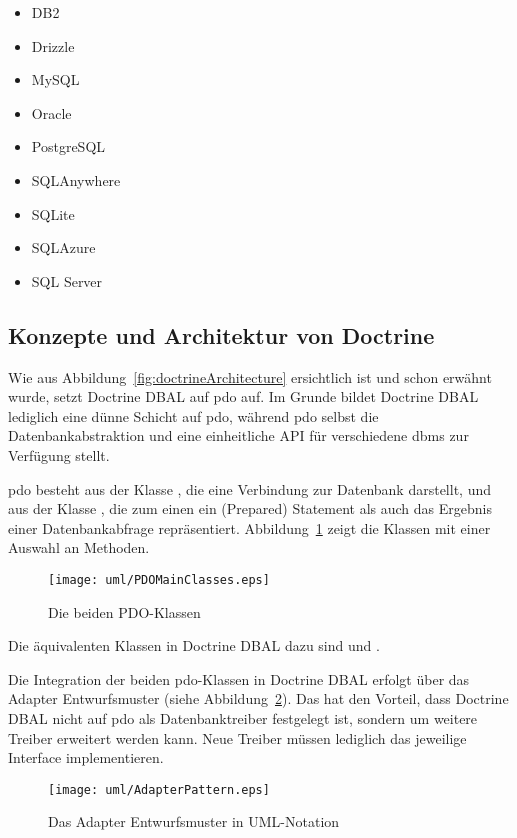 \begin{itemize}
		\item DB2
		\item Drizzle
		\item MySQL
		\item Oracle
		\item PostgreSQL
		\item SQLAnywhere
		\item SQLite
		\item SQLAzure
		\item SQL Server
\end{itemize}

\subsection{Konzepte und Architektur von Doctrine}
\label{basics:doctrine:subsec:conceptsAndArchitectureOfDoctrine}
Wie aus Abbildung~\ref{fig:doctrineArchitecture} ersichtlich ist und schon erwähnt wurde, setzt Doctrine DBAL auf \gls{pdo} auf. Im Grunde bildet Doctrine DBAL lediglich eine dünne Schicht auf \gls{pdo}, während \gls{pdo} selbst die Datenbankabstraktion und eine einheitliche API für verschiedene \gls{dbms} zur Verfügung stellt.

\gls{pdo} besteht aus der Klasse , die eine Verbindung zur Datenbank darstellt, und aus der Klasse , die zum einen ein (Prepared) Statement als auch das Ergebnis einer Datenbankabfrage repräsentiert. Abbildung~\ref{fig:PDOMainClasses} zeigt die Klassen mit einer Auswahl an Methoden.

\begin{figure}[H]
	\centering
	\texttt{[image: uml/PDOMainClasses.eps]}
	\caption{Die beiden PDO-Klassen}
	\label{fig:PDOMainClasses}
\end{figure}

Die äquivalenten Klassen in Doctrine DBAL dazu sind  und .

Die Integration der beiden \gls{pdo}-Klassen in Doctrine DBAL erfolgt über das Adapter Entwurfsmuster (siehe Abbildung~\ref{fig:adapterPattern}). Das hat den Vorteil, dass Doctrine DBAL nicht auf \gls{pdo} als Datenbanktreiber festgelegt ist, sondern um weitere Treiber erweitert werden kann. Neue Treiber müssen lediglich das jeweilige Interface implementieren.

\begin{figure}[H]
	\centering
	\texttt{[image: uml/AdapterPattern.eps]}
	\caption{Das Adapter Entwurfsmuster in UML-Notation}
	\label{fig:adapterPattern}
\end{figure}

